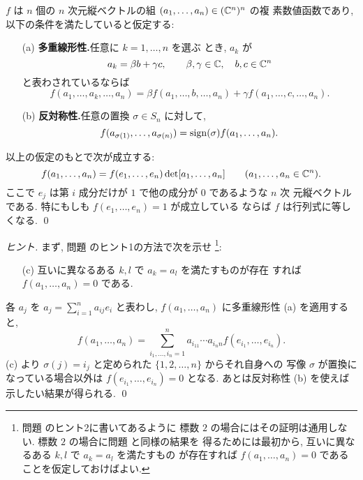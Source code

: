 \documentclass[12pt,twoside]{jarticle}
\begin{document}
\begin{question}[行列式の特徴付け]
  \label{q:char-det}
  $f$ は $n$ 個の $n$ 次元縦ベクトルの組 $(a_1,\ldots,a_n)\in({\mathbb C}^n)^n$ の複
  素数値函数であり, 以下の条件を満たしていると仮定する:
  \begin{enumerate}
  \item[(a)] {\bf 多重線形性.}\enspace 任意に $k=1,\ldots,n$ を選ぶ
    とき, $a_k$ が
    \begin{equation*}
      a_k = \beta b + \gamma c,
      \qquad
      \beta,\gamma\in{\mathbb C}, \quad b,c\in{\mathbb C}^n
    \end{equation*}
    と表わされているならば
    \begin{equation*}
      f(a_1,\ldots,a_k,\ldots,a_n)
      = \beta  f(a_1,\ldots,b,\ldots,a_n)
      + \gamma f(a_1,\ldots,c,\ldots,a_n).
    \end{equation*}
  \item[(b)] {\bf 反対称性.}\enspace 任意の置換 $\sigma\in S_n$ に対して,
    \begin{equation*}
      f(a_{\sigma(1)},\ldots,a_{\sigma(n)})
      = \mathop{\mathrm{sign}}\nolimits(\sigma) f(a_1,\ldots,a_n).
    \end{equation*}
  \end{enumerate}
  以上の仮定のもとで次が成立する:
  \begin{equation*}
    f(a_1,\ldots,a_n) = f(e_1,\ldots,e_n) \det[a_1,\ldots,a_n]
    \qquad (a_1,\ldots,a_n\in{\mathbb C}^n).
  \end{equation*}
  ここで $e_j$ は第 $i$ 成分だけが $1$ で他の成分が $0$ であるような $n$ 次
  元縦ベクトルである. 
  特にもしも $f(e_1,\ldots,e_n)=1$ が成立している
  ならば $f$ は行列式に等しくなる.
  \qed
\end{question}

\begin{proof}[ヒント]
  まず, 問題  のヒント1の方法で次を示せ
  \footnote{問題  のヒント2に書いてあるように
    標数 $2$ の場合にはその証明は通用しない. 
    標数 $2$ の場合に問題  と同様の結果を
    得るためには最初から, 互いに異なるある $k,l$ で $a_k=a_l$ を満たすもの
    が存在すれば $f(a_1,\ldots,a_n)=0$ であることを仮定しておけばよい.}:
  \begin{enumerate}
  \item[(c)] 互いに異なるある $k,l$ で $a_k=a_l$ を満たすものが存在
    すれば $f(a_1,\ldots,a_n)=0$ である.
  \end{enumerate}

  各 $a_j$ を $a_j = \sum_{i=1}^n a_{ij}e_i$ と表わし, 
  $f(a_1,\ldots,a_n)$ に多重線形性 (a) を適用すると,
  \begin{equation*}
    f(a_1,\ldots,a_n) = 
    \sum_{i_1,\ldots,i_n=1}^n 
    a_{i_11}\cdots a_{i_nn} f(e_{i_1},\ldots,e_{i_n}).
  \end{equation*}
  (c) より $\sigma(j)=i_j$ と定められた $\{1,2,\ldots,n\}$ からそれ自身への
  写像 $\sigma$ が置換になっている場合以外は $f(e_{i_1},\ldots,e_{i_n})=0$ 
  となる. あとは反対称性 (b) を使えば示したい結果が得られる.
  \qed
\end{proof}
\end{document}
